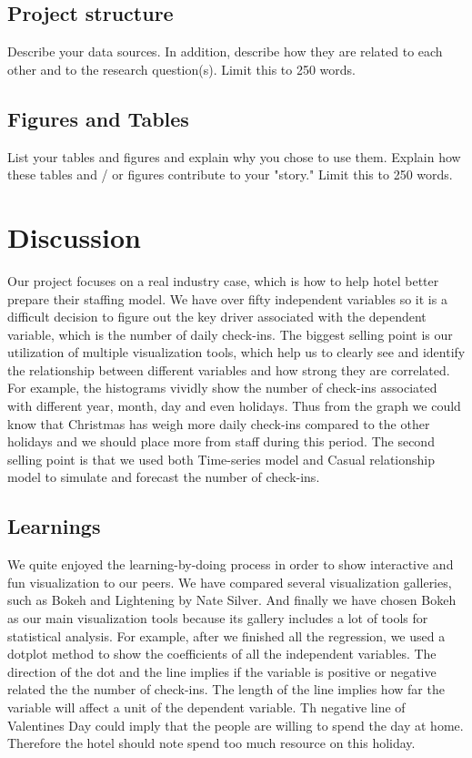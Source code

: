 \documentclass{article}
\begin{document}
\subsection{Project structure}

Describe your data sources. In addition, describe how they are related to each other and to the research question(s). Limit this to 250 words.

\subsection{Figures and Tables}

List your tables and figures and explain why you chose to use them. Explain how these tables and / or figures contribute to your "story." Limit this to 250 words.


\section{Discussion}

Our project focuses on a real industry case, which is how to help hotel better prepare their staffing model. We have over fifty independent variables so it is a difficult decision to figure out the key driver associated with the dependent variable, which is the number of daily check-ins. The biggest selling point is our utilization of multiple visualization tools, which help us to clearly see and identify the relationship between different variables and how strong they are correlated. For example, the histograms vividly show the number of check-ins associated with different year, month, day and even holidays. Thus from the graph we could know that Christmas has weigh more daily check-ins compared to the other holidays and we should place more from staff during this period. The second selling point is that we used both Time-series model and Casual relationship model to simulate and forecast the number of check-ins.

\subsection{Learnings}

We quite enjoyed the learning-by-doing process in order to show interactive and fun visualization to our peers. We have compared several visualization galleries, such as Bokeh and Lightening by Nate Silver. And finally we have chosen Bokeh as our main visualization tools because its gallery includes a lot of tools for statistical analysis. For example, after we finished all the regression, we used a dotplot method to show the coefficients of all the independent variables. The direction of the dot and the line implies if the variable is positive or negative related the the number of check-ins. The length of the line implies how far the variable will affect a unit of the dependent variable. Th negative line of Valentines Day could imply that the people are willing to spend the day at home. Therefore the hotel should note spend too much resource on this holiday.
\end{document}

